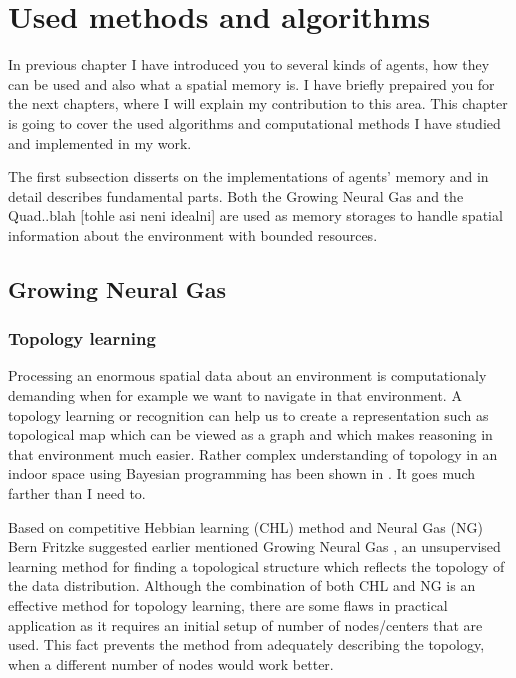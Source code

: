 \chapter{Used methods and algorithms}

In previous chapter I have introduced you to several kinds of agents, how they can be used and also what a spatial memory is. I have briefly prepaired you for the next chapters, where I will explain my contribution to this area. This chapter is going to cover the used algorithms and computational methods I have studied and implemented in my work. 

The first subsection disserts on the implementations of agents' memory and in detail describes fundamental parts. Both the Growing Neural Gas and the Quad..blah [tohle asi neni idealni] are used as memory storages to handle spatial information about the environment with bounded resources.

\section{Growing Neural Gas}   
\label{usedalgo:gng}

\subsection{Topology learning}

Processing an enormous spatial data about an environment is computationaly demanding when for example we want to navigate in that environment. A topology learning or recognition can help us to create a representation such as topological map which can be viewed as a graph and which makes reasoning in that environment much easier. Rather complex understanding of topology in an indoor space using Bayesian programming has been shown in \cite{Tapus:topologylearning}. It goes much farther than I need to. 

Based on competitive Hebbian learning (CHL) method \cite{Martinetz:chl} and Neural Gas (NG) \cite{Martinetz:ng} Bern Fritzke suggested earlier mentioned Growing Neural Gas \cite{Fritzke:gng}, an unsupervised learning method for finding a topological structure which reflects the topology of the data distribution. Although the combination of both CHL and NG is an effective method for topology learning, there are some flaws in practical application as it requires an initial setup of number of nodes/centers that are used. This fact prevents the method from adequately describing the topology, when a different number of nodes would work better.

